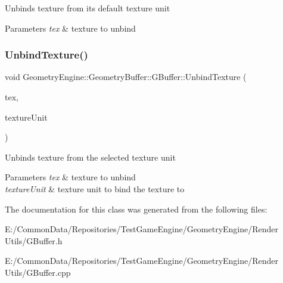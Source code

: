 Unbinds texture from its default texture unit 
\begin{DoxyParams}{Parameters}
{\em tex} & texture to unbind \\
\hline
\end{DoxyParams}
\mbox{\label{class_geometry_engine_1_1_geometry_buffer_1_1_g_buffer_a0bbb50c4eabcee8677a3da316042c44e}} 
\subsubsection{\texorpdfstring{UnbindTexture()}{UnbindTexture()}\hspace{0.1cm}{\footnotesize\ttfamily [4/4]}}
{\footnotesize\ttfamily void Geometry\+Engine\+::\+Geometry\+Buffer\+::\+G\+Buffer\+::\+Unbind\+Texture (\begin{DoxyParamCaption}\item[{\mbox{\hyperlink{class_geometry_engine_1_1_geometry_buffer_1_1_g_buffer_a718dceafcac1915f7de061108597e1cc}{G\+B\+U\+F\+F\+E\+R\+\_\+\+T\+E\+X\+T\+U\+R\+E\+\_\+\+T\+Y\+PE}}}]{tex,  }\item[{unsigned int}]{texture\+Unit }\end{DoxyParamCaption})}

Unbinds texture from the selected texture unit 
\begin{DoxyParams}{Parameters}
{\em tex} & texture to unbind \\
\hline
{\em texture\+Unit} & texture unit to bind the texture to \\
\hline
\end{DoxyParams}


The documentation for this class was generated from the following files\+:\begin{DoxyCompactItemize}
\item 
E\+:/\+Common\+Data/\+Repositories/\+Test\+Game\+Engine/\+Geometry\+Engine/\+Render Utils/G\+Buffer.\+h\item 
E\+:/\+Common\+Data/\+Repositories/\+Test\+Game\+Engine/\+Geometry\+Engine/\+Render Utils/G\+Buffer.\+cpp\end{DoxyCompactItemize}
